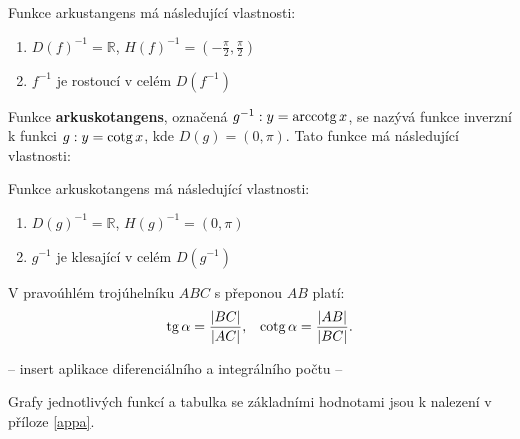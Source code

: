 \begin{pozn}
Funkce arkustangens má následující vlastnosti:
\begin{enumerate}
\item $D(f)^{-1} = \mathbb{R}$, $H(f)^{-1} = \left ( -\frac{\pi}{2}, \frac{\pi}{2} \right )$
\item $f^{-1}$ je rostoucí v celém $D(f^{-1})$
\end{enumerate}
\end{pozn}

\begin{definition}[Arkuskotangens]
  Funkce \textbf{arkuskotangens}, označená $g^{-1}: y=\operatorname{arccotg} x$, se nazývá funkce inverzní k funkci $g: y=\operatorname{cotg} x$, kde $D(g)=\left ( 0, \pi \right )$. Tato funkce má následující vlastnosti:
\end{definition}

\begin{pozn}
Funkce arkuskotangens má následující vlastnosti:
\begin{enumerate}
\item $D(g)^{-1} = \mathbb{R}$, $H(g)^{-1} = \left ( 0, \pi \right )$
\item $g^{-1}$ je klesající v celém $D(g^{-1})$
\end{enumerate}
\end{pozn}

\begin{veta}
    V pravoúhlém trojúhelníku $ABC$ s přeponou $AB$ platí:
    \begin{align*}
        \operatorname{tg} \alpha = \frac{ |BC| }{ |AC| }, & & \operatorname{cotg} \alpha = \frac{|AB|}{|BC|}.
    \end{align*}
\end{veta}

-- insert aplikace diferenciálního a integrálního počtu --

\begin{pozn}
    Grafy jednotlivých funkcí a tabulka se základními hodnotami jsou k nalezení
    v příloze \ref{appa}.
\end{pozn}
